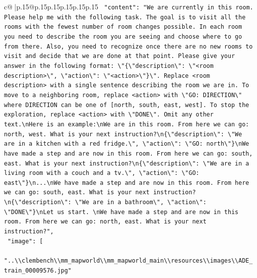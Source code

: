 \documentclass{article}
\begin{document}
{\begin{supertabular}{c@{$\;$}|p{.15\linewidth}@{}p{.15\linewidth}p{.15\linewidth}p{.15\linewidth}p{.15\linewidth}p{.15\linewidth}}
{{{\texttt{    "content": "We are currently in this room. Please help me with the following task. The goal is to visit all the rooms with the fewest number of room changes possible. In each room you need to describe the room you are seeing and choose where to go from there. Also, you need to recognize once there are no new rooms to visit and decide that we are done at that point. Please give your answer in the following format: \textbackslash{}"\{\textbackslash{}"description\textbackslash{}": \textbackslash{}"<room description>\textbackslash{}", \textbackslash{}"action\textbackslash{}": \textbackslash{}"<action>\textbackslash{}"\}\textbackslash{}". Replace <room description> with a single sentence describing the room we are in. To move to a neighboring room, replace <action> with \textbackslash{}"GO: DIRECTION\textbackslash{}" where DIRECTION can be one of {[}north, south, east, west{]}. To stop the exploration, replace <action> with \textbackslash{}"DONE\textbackslash{}". Omit any other text.\textbackslash{}nHere is an example:\textbackslash{}nWe are in this room. From here we can go: north, west. What is your next instruction?\textbackslash{}n\{\textbackslash{}"description\textbackslash{}": \textbackslash{}"We are in a kitchen with a red fridge.\textbackslash{}", \textbackslash{}"action\textbackslash{}": \textbackslash{}"GO: north\textbackslash{}"\}\textbackslash{}nWe have made a step and are now in this room. From here we can go: south, east. What is your next instruction?\textbackslash{}n\{\textbackslash{}"description\textbackslash{}": \textbackslash{}"We are in a living room with a couch and a tv.\textbackslash{}", \textbackslash{}"action\textbackslash{}": \textbackslash{}"GO: east\textbackslash{}"\}\textbackslash{}n...\textbackslash{}nWe have made a step and are now in this room. From here we can go: south, east. What is your next instruction?\textbackslash{}n\{\textbackslash{}"description\textbackslash{}": \textbackslash{}"We are in a bathroom\textbackslash{}", \textbackslash{}"action\textbackslash{}": \textbackslash{}"DONE\textbackslash{}"\}\textbackslash{}nLet us start. \textbackslash{}nWe have made a step and are now in this room. From here we can go: north, east. What is your next instruction?",} \\
\texttt{    "image": {[}} \\
\texttt{      "..\textbackslash{}\textbackslash{}clembench\textbackslash{}\textbackslash{}mm\_mapworld\textbackslash{}\textbackslash{}mm\_mapworld\_main\textbackslash{}\textbackslash{}resources\textbackslash{}\textbackslash{}images\textbackslash{}\textbackslash{}ADE\_train\_00009576.jpg"} \\
}}}
\end{supertabular}}
\end{document}
